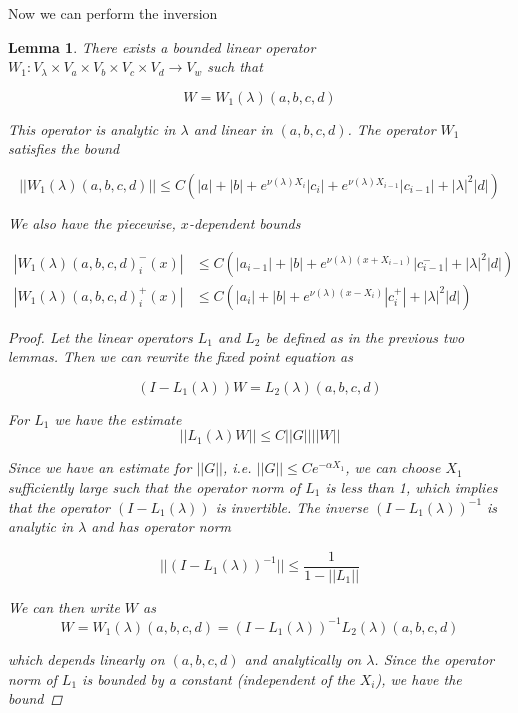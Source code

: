 \documentclass[12pt]{article}
\newtheorem{lemma}{Lemma}
\begin{document}
Now we can perform the inversion


\begin{lemma}\label{W1}
There exists a bounded linear operator $W_1: V_\lambda \times V_a \times V_b \times V_c \times V_d \rightarrow V_w$ such that 

\[
W = W_1(\lambda)(a,b,c,d)
\]

This operator is analytic in $\lambda$ and linear in $(a, b, c, d)$. The operator $W_1$ satisfies the bound

\begin{equation}\label{W1bound}
||W_1(\lambda)(a,b,c,d)|| \leq C ( |a| + |b| + e^{\nu(\lambda)X_i}|c_i| + e^{\nu(\lambda)X_{i-1}}|c_{i-1}| + |\lambda|^2 |d| )
\end{equation}

We also have the piecewise, $x$-dependent bounds

\begin{align*}
|W_1(\lambda)(a,b,c,d)_i^-(x)| &\leq C ( |a_{i-1}| + |b| + e^{\nu(\lambda)(x + X_{i-1})}|c_{i-1}^-| + |\lambda|^2 |d| ) \\
|W_1(\lambda)(a,b,c,d)_i^+(x)| &\leq C ( |a_i| + |b| + e^{\nu(\lambda)(x - X_i)}|c_i^+| + |\lambda|^2 |d| )
\end{align*}

\begin{proof}
Let the linear operators $L_1$ and $L_2$ be defined as in the previous two lemmas. Then we can rewrite the fixed point equation as

\[
(I - L_1(\lambda))W = L_2(\lambda)(a,b,c,d)
\]

For $L_1$ we have the estimate
\[
||L_1(\lambda)W|| \leq C ||G|| ||W||
\]

Since we have an estimate for $||G||$, i.e. $||G|| \leq C e^{-\alpha X_1}$, we can choose $X_1$ sufficiently large such that the operator norm of $L_1$ is less than 1, which implies that the operator $(I - L_1(\lambda))$ is invertible. The inverse $(I - L_1(\lambda))^{-1}$ is analytic in $\lambda$ and has operator norm 

\[
||(I - L_1(\lambda))^{-1}|| \leq \frac{1}{1 - ||L_1||}
\]

We can then write $W$ as
\[
W = W_1(\lambda)(a,b,c,d) = (I - L_1(\lambda))^{-1} L_2(\lambda)(a,b,c,d)
\]

which depends linearly on $(a,b,c,d)$ and analytically on $\lambda$. Since the operator norm of $L_1$ is bounded by a constant (independent of the $X_i$), we have the bound


\end{proof}
\end{lemma}
\end{document}
